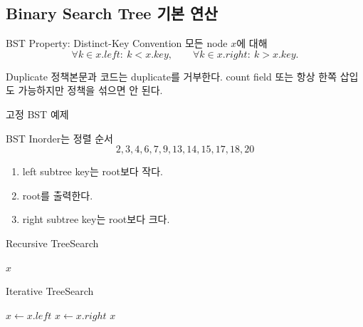 \subsection{Binary Search Tree 기본 연산}
\begin{frame}{BST Property: Distinct-Key Convention}
모든 node $x$에 대해
\[
\forall k\in x.left:\ k<x.key,\qquad
\forall k\in x.right:\ k>x.key.
\]
\begin{alertblock}{Duplicate 정책}본문과 코드는 duplicate를 거부한다. count field 또는 항상 한쪽 삽입도 가능하지만 정책을 섞으면 안 된다.\end{alertblock}
\end{frame}
\begin{frame}{고정 BST 예제}
\centering{}
\end{frame}
\begin{frame}{BST Inorder는 정렬 순서}
\[
2,3,4,6,7,9,13,14,15,17,18,20
\]
\begin{enumerate}\item left subtree key는 root보다 작다.\item root를 출력한다.\item right subtree key는 root보다 크다.\end{enumerate}
\end{frame}
\begin{frame}{Recursive TreeSearch}
\small\begin{algorithmic}[1]
\State\Return $x$\EndIf
{}\State\Return {}\EndIf
\State\Return {}
\EndProcedure
\end{algorithmic}
\end{frame}
\begin{frame}{Iterative TreeSearch}
\small\begin{algorithmic}[1]
\State $x\gets x.left$
\Else\State $x\gets x.right$\EndIf
\EndWhile
\State\Return $x$
\EndProcedure
\end{algorithmic}
\end{frame}
